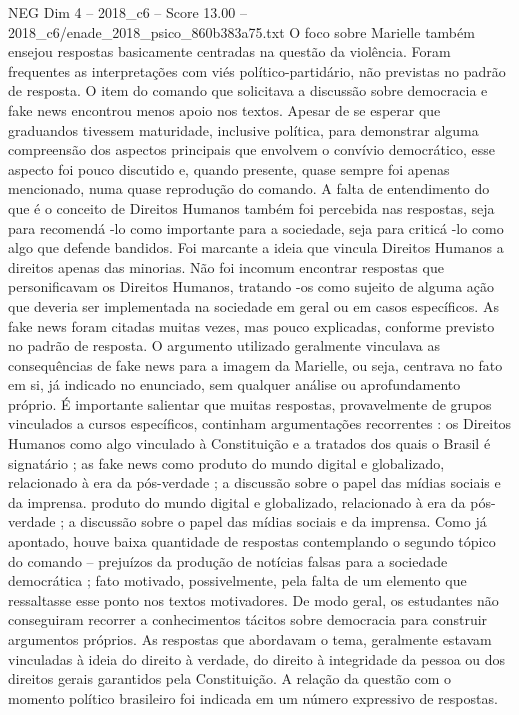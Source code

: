 \begin{textsample}{NEG Dim 4 – 2018\_c6 – Score 13.00 – 2018\_c6/enade\_2018\_psico\_860b383a75.txt}
O foco sobre Marielle também ensejou respostas basicamente centradas na questão da violência.
Foram frequentes as interpretações com viés político-partidário, não previstas no padrão de resposta.
O item do comando que solicitava a discussão sobre democracia e fake news encontrou menos apoio nos textos.
Apesar de se esperar que graduandos tivessem maturidade, inclusive política, para demonstrar alguma compreensão dos aspectos principais que envolvem o convívio democrático, esse aspecto foi pouco discutido e, quando presente, quase sempre foi apenas mencionado, numa quase reprodução do comando.
A falta de entendimento do que é o conceito de Direitos Humanos também foi percebida nas respostas, seja para recomendá -lo como importante para a sociedade, seja para criticá -lo como algo que defende bandidos.
Foi marcante a ideia que vincula Direitos Humanos a direitos apenas das minorias.
Não foi incomum encontrar respostas que personificavam os Direitos Humanos, tratando -os como sujeito de alguma ação que deveria ser implementada na sociedade em geral ou em casos específicos.
As fake news foram citadas muitas vezes, mas pouco explicadas, conforme previsto no padrão de resposta.
O argumento utilizado geralmente vinculava as consequências de fake news para a imagem da Marielle, ou seja, centrava no fato em si, já indicado no enunciado, sem qualquer análise ou aprofundamento próprio.
É importante salientar que muitas respostas, provavelmente de grupos vinculados a cursos específicos, continham argumentações recorrentes : os Direitos Humanos como algo vinculado à Constituição e a tratados dos quais o Brasil é signatário ; as fake news como produto do mundo digital e globalizado, relacionado à era da pós-verdade ; a discussão sobre o papel das mídias sociais e da imprensa. produto do mundo digital e globalizado, relacionado à era da pós-verdade ; a discussão sobre o papel das mídias sociais e da imprensa.
Como já apontado, houve baixa quantidade de respostas contemplando o segundo tópico do comando – prejuízos da produção de notícias falsas para a sociedade democrática ; fato motivado, possivelmente, pela falta de um elemento que ressaltasse esse ponto nos textos motivadores.
De modo geral, os estudantes não conseguiram recorrer a conhecimentos tácitos sobre democracia para construir argumentos próprios.
As respostas que abordavam o tema, geralmente estavam vinculadas à ideia do direito à verdade, do direito à integridade da pessoa ou dos direitos gerais garantidos pela Constituição.
A relação da questão com o momento político brasileiro foi indicada em um número expressivo de respostas.

\end{textsample}
